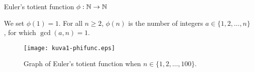 \documentclass{article}
\begin{document}
\begin{definition}
Euler's totient function $\phi: \mathbb{N} \rightarrow \mathbb{N}$

We set $\phi(1) = 1$. For all $n \geq 2$, $\phi(n)$ is the number of integers $a \in \{1,2,\dots,n\}$, for which $\gcd(a,n) = 1$.

\end{definition}


\begin{figure}[!htb]
    \centering
    \texttt{[image: kuva1-phifunc.eps]}
    \caption{Graph of Euler's totient function when $n\in\{1,2,\dots,100\}$.}
    \label{fig:k1}
\end{figure}

\clearpage
\end{document}
